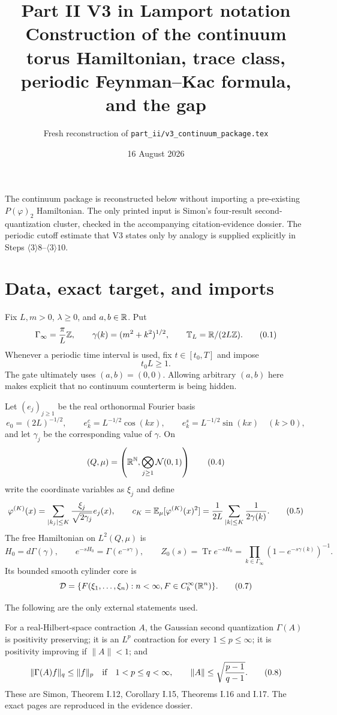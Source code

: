 \documentclass[11pt,a4paper]{article}
\title{Part II V3 in Lamport notation\\[3pt]
\large Construction of the continuum torus Hamiltonian, trace class, periodic
Feynman--Kac formula, and the gap}
\author{Fresh reconstruction of \texttt{part\_ii/v3\_continuum\_package.tex}}
\date{16 August 2026}
\newcommand{\T}{\mathbb T}
\newcommand{\Z}{\mathbb Z}
\newcommand{\N}{\mathbb N}
\newcommand{\D}{\mathcal D}
\newcommand{\Tr}{\operatorname{Tr}}
\begin{document}
\maketitle

\begin{resultbox}
The continuum package is reconstructed below without importing a pre-existing
$P(\varphi)_2$ Hamiltonian.  The only printed input is Simon's four-result
second-quantization cluster, checked in the accompanying citation-evidence dossier.
The periodic cutoff estimate that V3 states only by analogy is supplied explicitly
in Steps $\langle3\rangle8$--$\langle3\rangle10$.
\end{resultbox}
\tableofcontents

\section{Data, exact target, and imports}

Fix $L,m>0$, $\lambda\ge0$, and $a,b\in\mathbb R$.  Put
\[
 \Gamma_\infty=\frac\pi L\Z,
 \qquad \gamma(k)=(m^2+k^2)^{1/2},
 \qquad \T_L=\R/(2L\Z).
\tag{0.1}
\]
Whenever a periodic time interval is used, fix $t\in[t_0,T]$ and impose
\[
 t_0L\ge1.\tag{0.2}
\]
The gate ultimately uses $(a,b)=(0,0)$.  Allowing arbitrary $(a,b)$ here makes
explicit that no continuum counterterm is being hidden.

Let $(e_j)_{j\ge1}$ be the real orthonormal Fourier basis
\[
 e_0=(2L)^{-1/2},\qquad e_k^c=L^{-1/2}\cos(kx),\qquad
 e_k^s=L^{-1/2}\sin(kx)\quad(k>0),
\tag{0.3}
\]
and let $\gamma_j$ be the corresponding value of $\gamma$.  On
\[
 (Q,\mu)=\left(\R^\N,\bigotimes_{j\ge1}\mathcal N(0,1)\right)
\tag{0.4}
\]
write the coordinate variables as $\xi_j$ and define
\[
 \varphi^{(K)}(x)=\sum_{|k_j|\le K}
 \frac{\xi_j}{\sqrt{2\gamma_j}}e_j(x),
 \qquad
 c_K=\mathbb E_\mu[\varphi^{(K)}(x)^2]
 =\frac1{2L}\sum_{|k|\le K}\frac1{2\gamma(k)}.
\tag{0.5}
\]
The free Hamiltonian on $L^2(Q,\mu)$ is
\[
 H_0=d\Gamma(\gamma),\qquad e^{-sH_0}=\Gamma(e^{-s\gamma}),
 \qquad
 Z_0(s)=\Tr e^{-sH_0}=\prod_{k\in\Gamma_\infty}(1-e^{-s\gamma(k)})^{-1}.
\tag{0.6}
\]
Its bounded smooth cylinder core is
\[
 \D=\{F(\xi_1,\ldots,\xi_n):n<\infty, F\in C_b^\infty(\R^n)\}.
\tag{0.7}
\]

The following are the only external statements used.

\begin{assumption}
For a real-Hilbert-space contraction $A$, the Gaussian second quantization
$\Gamma(A)$ is positivity preserving; it is an $L^p$ contraction for every
$1\le p\le\infty$; it is positivity improving if $\|A\|<1$; and
\[
 \|\Gamma(A)f\|_q\le\|f\|_p
 \quad\hbox{if}\quad
 1<p\le q<\infty,\qquad
 \|A\|\le\sqrt{\frac{p-1}{q-1}}.
\tag{0.8}
\]
These are Simon, Theorem I.12, Corollary I.15, Theorems I.16 and I.17.
The exact pages are reproduced in the evidence dossier.
\end{assumption}
\end{document}

